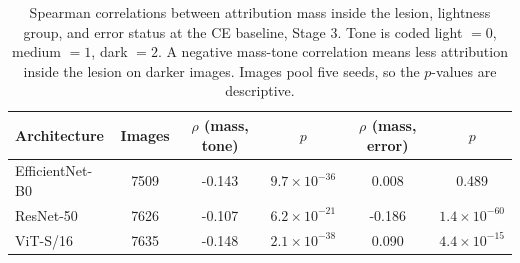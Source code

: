 \begin{table}[t]
\centering
\small
\caption{Spearman correlations between attribution mass inside the lesion, lightness group, and error status at the CE baseline, Stage 3. Tone is coded light $=0$, medium $=1$, dark $=2$. A negative mass-tone correlation means less attribution inside the lesion on darker images. Images pool five seeds, so the $p$-values are descriptive.}
\label{tab:xaicorr}
\begin{tabular}{lccccc}
\toprule
Architecture & Images & $\rho$ (mass, tone) & $p$ & $\rho$ (mass, error) & $p$ \\
\midrule
EfficientNet-B0 & 7509 & -0.143 & $9.7\times10^{-36}$ & 0.008 & 0.489 \\
ResNet-50 & 7626 & -0.107 & $6.2\times10^{-21}$ & -0.186 & $1.4\times10^{-60}$ \\
ViT-S/16 & 7635 & -0.148 & $2.1\times10^{-38}$ & 0.090 & $4.4\times10^{-15}$ \\
\bottomrule
\end{tabular}
\end{table}
